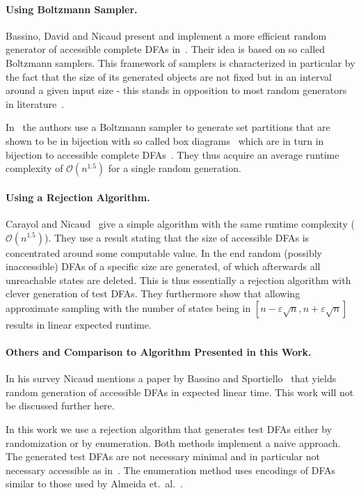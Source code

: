 \paragraph*{Using Boltzmann Sampler.}

Bassino, David and Nicaud present and implement a more efficient random generator of accessible complete DFAs in~\cite{BDN07, BN07}. Their idea is based on so called Boltzmann samplers. This framework of samplers is characterized in particular by the fact that the size of its generated objects are not fixed but in an interval around a given input size - this stands in opposition to most random generators in literature~\cite[p. 2]{DFL04}.

In~\cite{BN07} the authors use a Boltzmann sampler to generate set partitions that are shown to be in bijection with so called box diagrams~\cite[p. 8]{BN07} which are in turn in bijection to accessible complete DFAs~\cite[p. 4]{BN07}. They thus acquire an average runtime complexity of $\mathcal{O}(n^{1.5})$ for a single random generation.

\paragraph*{Using a Rejection Algorithm.}

Carayol and Nicaud~\cite{CN12} give a simple algorithm with the same runtime complexity ($\mathcal{O}(n^{1.5})$). They use a result stating that the size of accessible DFAs is concentrated around some computable value. In the end random (possibly inaccessible) DFAs of a specific size are generated, of which afterwards all unreachable states are deleted. This is thus essentially a rejection algorithm with clever generation of test DFAs. They furthermore show that allowing approximate sampling with the number of states being in $[n-\varepsilon\sqrt{n}, n+\varepsilon\sqrt{n}]$ results in linear expected runtime.

\paragraph*{Others and Comparison to Algorithm Presented in this Work.}

In his survey Nicaud mentions a paper by Bassino and Sportiello~\cite{BS13} that yields random generation of accessible DFAs in expected linear time. This work will not be discussed further here.

In this work we use a rejection algorithm that generates test DFAs either by randomization or by enumeration. Both methods implement a naive approach. The generated test DFAs are not necessary minimal and in particular not necessary accessible as in~\cite{CN12}. The enumeration method uses encodings of DFAs similar to those used by Almeida et.\ al.~\cite{RMA05}.


